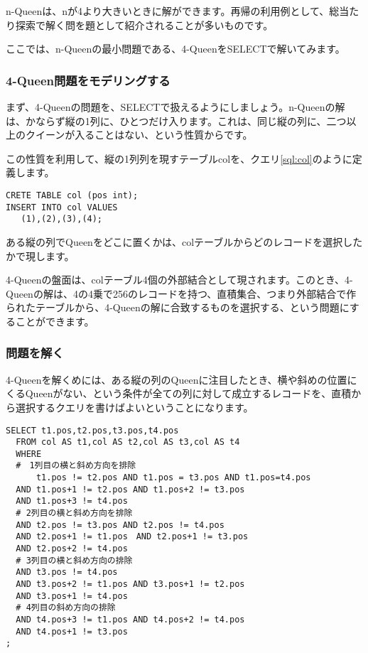 n-Queenは、nが4より大きいときに解ができます。再帰の利用例として、総当たり探索で解く問を題として紹介されることが多いものです。

ここでは、n-Queenの最小問題である、4-QueenをSELECTで解いてみます。

\subsubsection{4-Queen問題をモデリングする}

まず、4-Queenの問題を、SELECTで扱えるようにしましょう。n-Queenの解は、かならず縦の1列に、ひとつだけ入ります。これは、同じ縦の列に、二つ以上のクイーンが入ることはない、という性質からです。

この性質を利用して、縦の1列列を現すテーブルcolを、クエリ\ref{sql:col}のように定義します。

\begin{lstlisting}[caption=縦の列を定義するテーブル,label=sql:col]
CRETE TABLE col (pos int);
INSERT INTO col VALUES
   (1),(2),(3),(4);
\end{lstlisting}

ある縦の列でQueenをどこに置くかは、colテーブルからどのレコードを選択したかで現します。

4-Queenの盤面は、colテーブル4個の外部結合として現されます。このとき、4-Queenの解は、4の4乗で256のレコードを持つ、直積集合、つまり外部結合で作られたテーブルから、4-Queenの解に合致するものを選択する、という問題にすることができます。

\subsubsection{問題を解く}

4-Queenを解くめには、ある縦の列のQueenに注目したとき、横や斜めの位置にくるQueenがない、という条件が全ての列に対して成立するレコードを、直積から選択するクエリを書けばよいということになります。

\begin{lstlisting}[caption=4-Queenを解く,label=sql:4queen]
SELECT t1.pos,t2.pos,t3.pos,t4.pos
  FROM col AS t1,col AS t2,col AS t3,col AS t4
  WHERE 
  #　1列目の横と斜め方向を排除
      t1.pos != t2.pos AND t1.pos = t3.pos AND t1.pos=t4.pos
  AND t1.pos+1 != t2.pos AND t1.pos+2 != t3.pos 
  AND t1.pos+3 != t4.pos
  # 2列目の横と斜め方向を排除
  AND t2.pos != t3.pos AND t2.pos != t4.pos
  AND t2.pos+1 != t1.pos　AND t2.pos+1 != t3.pos
  AND t2.pos+2 != t4.pos
  # 3列目の横と斜め方向の排除
  AND t3.pos != t4.pos
  AND t3.pos+2 != t1.pos AND t3.pos+1 != t2.pos
  AND t3.pos+1 != t4.pos
  # 4列目の斜め方向の排除
  AND t4.pos+3 != t1.pos AND t4.pos+2 != t4.pos
  AND t4.pos+1 != t3.pos
;
\end{lstlisting}

